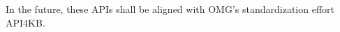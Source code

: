 \documentclass[10pt,fleqn,%
\ifpretendfinal
final%
\else
draft%
\fi,
]{scrreprt}
\newcommand{\infannex}[1]{ \chapter{Annex (informative): #1} }
\newcommand\blankpage{%
    \null
    \thispagestyle{empty}%
    \addtocounter{page}{-1}%
    \newpage}
\begin{document}
In the future, these APIs shall be aligned with OMG's standardization
effort API4KB.


\newpage

\clearpage

 
\renewcommand{\bibname}{References}
\label{a:bibliography}



\newpage
\clearpage

\printindex
{}
\blankpage
\end{document}
